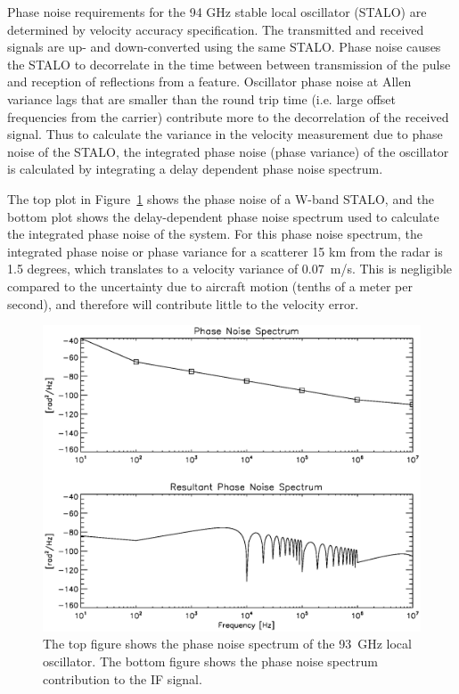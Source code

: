 \documentclass[12pt,letterpaper]{article}
\begin{document}
Phase noise requirements for the 94 GHz stable local oscillator
(STALO) are determined by velocity accuracy specification. The
transmitted and received signals are up- and down-converted using the
same STALO. Phase noise causes the STALO to decorrelate in the time
between between transmission of the pulse and reception of reflections
from a feature. Oscillator phase noise at Allen variance lags that are
smaller than the round trip time (i.e. large offset frequencies from
the carrier) contribute more to the decorrelation of the received
signal. Thus to calculate the variance in the velocity measurement due
to phase noise of the STALO, the integrated phase noise (phase
variance) of the oscillator is calculated by integrating a delay
dependent phase noise spectrum.

The top plot in Figure~\ref{fig:phase_noise} shows the phase noise of
a W-band STALO, and the bottom plot shows the delay-dependent phase
noise spectrum used to calculate the integrated phase noise of the
system. For this phase noise spectrum, the integrated phase noise or
phase variance for a scatterer 15 km from the radar is 1.5 degrees,
which translates to a velocity variance of 0.07~m/s. This is
negligible compared to the uncertainty due to aircraft motion (tenths
of a meter per second), and therefore will contribute little to the
velocity error.

\begin{figure}[htbp]
  \centering
  \includegraphics[scale=0.9]{w_phase_noise.eps}
  \caption{The top figure shows the phase noise spectrum of the 93~GHz
  local oscillator. The bottom figure shows the phase noise spectrum
  contribution to the IF signal.}
  \label{fig:phase_noise}
\end{figure}
\end{document}
